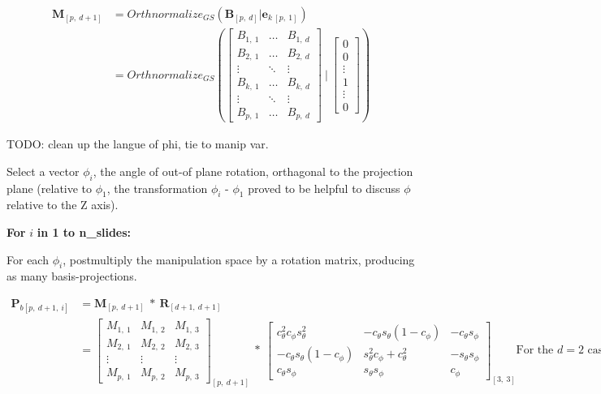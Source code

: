 \documentclass{monashthesis}
\begin{document}
\begin{align*}
  \textbf{M}_{[p,~d+1]}
  &= Orthnormalize_{GS}( \textbf{B}_{[p,~d]}|\textbf{e}_{k~[p,~1]} ) \\
  &= Orthnormalize_{GS}
  \left(
    \begin{bmatrix}
      B_{1,~1} & \dots  & B_{1,~d} \\
      B_{2,~1} & \dots  & B_{2,~d} \\
      \vdots   & \ddots & \vdots   \\
      B_{k,~1} & \dots  & B_{k,~d} \\
      \vdots   & \ddots & \vdots   \\
      B_{p,~1} & \dots  & B_{p,~d}
    \end{bmatrix}
  ~|~
    \begin{bmatrix}
      0 \\
      0 \\
      \vdots \\
      1 \\
      \vdots \\
      0
    \end{bmatrix}
  \right)
\end{align*}

TODO: clean up the langue of phi, tie to manip var.

Select a vector \(\phi_i\), the angle of out-of plane rotation,
orthagonal to the projection plane (relative to \(\phi_1\), the
transformation \(\phi_i\) - \(\phi_1\) proved to be helpful to discuss
\(\phi\) relative to the Z axis).

\textbf{For } \(i\) \textbf{in 1 to n\_slides:}

For each \(\phi_i\), postmultiply the manipulation space by a rotation
matrix, producing as many basis-projections.

\begin{align*}
  \textbf{P}_{b[p,~d+1,~i]}
  &= \textbf{M}_{[p,~d+1]} ~*~ \textbf{R}_{[d+1,~d+1]} \\
  &= \begin{bmatrix}
    M_{1,~1} & M_{1,~2} & M_{1,~3} \\
    M_{2,~1} & M_{2,~2} & M_{2,~3} \\
    \vdots   & \vdots   & \vdots   \\
    M_{p,~1} & M_{p,~2} & M_{p,~3}
  \end{bmatrix}_{[p,~d+1]}
    ~*~
  \begin{bmatrix}
    c_\theta^2 c_\phi s_\theta^2 &
    -c_\theta s_\theta (1 - c_\phi) &
    -c_\theta s_\phi \\
    -c_\theta s_\theta (1 - c_\phi) &
    s_\theta^2 c_\phi + c_\theta^2 &
    -s_\theta s_\phi \\
    c_\theta s_\phi &
    s_\theta s_\phi &
    c_\phi
  \end{bmatrix}_{[3,~3]}\text{For the $d=2$ case.}
\end{align*}
\end{document}
